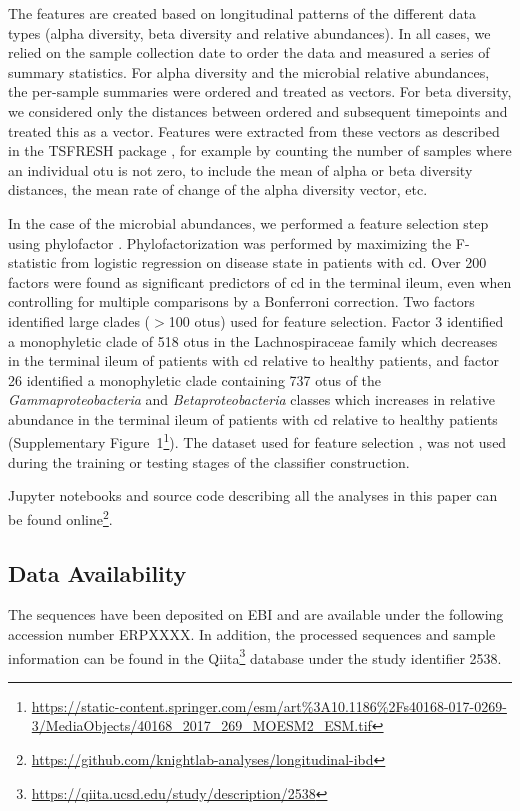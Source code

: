 The features are created based on longitudinal patterns of the different data types (alpha diversity, beta diversity and relative abundances). In all cases, we relied on the sample collection date to order the data and measured a series of summary statistics. For alpha diversity and the microbial relative abundances, the per-sample summaries were ordered and treated as vectors. For beta diversity, we considered only the distances between ordered and subsequent timepoints and treated this as a vector. Features were extracted from these vectors as described in the TSFRESH package \cite{RN4216}, for example by counting the number of samples where an individual \gls{otu} is not zero, to include the mean of alpha or beta diversity distances, the mean rate of change of the alpha diversity vector, etc.

In the case of the microbial abundances, we performed a feature selection step using phylofactor \cite{RN4204}. Phylofactorization was performed by maximizing the F-statistic from logistic regression on disease state in patients with \gls{cd}. Over 200 factors were found as significant predictors of \gls{cd} in the terminal ileum, even when controlling for multiple comparisons by a Bonferroni correction. Two factors identified large clades ($>$100 \glspl{otu}) used for feature selection. Factor 3 identified a monophyletic clade of 518 \glspl{otu} in the Lachnospiraceae family which decreases in the terminal ileum of patients with \gls{cd} relative to healthy patients, and factor 26 identified a monophyletic clade containing 737 \glspl{otu} of the \textit{Gammaproteobacteria} and \textit{Betaproteobacteria} classes which increases in relative abundance in the terminal ileum of patients with \gls{cd} relative to healthy patients (Supplementary Figure~1\footnote{\url{https://static-content.springer.com/esm/art\%3A10.1186\%2Fs40168-017-0269-3/MediaObjects/40168_2017_269_MOESM2_ESM.tif}}). The dataset used for feature selection \cite{RN140}, was not used during the training or testing stages of the classifier construction.

Jupyter notebooks and source code describing all the analyses in this paper can be found online\footnote{\url{https://github.com/knightlab-analyses/longitudinal-ibd}}.

\subsection{Data Availability}

The sequences have been deposited on EBI and are available under the following accession number ERPXXXX.  In addition, the processed sequences and sample information can be found in the Qiita\footnote{\url{https://qiita.ucsd.edu/study/description/2538}} database under the study identifier 2538.


